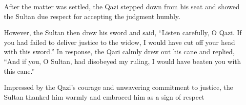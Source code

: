 \documentclass{article}
\begin{document}
After the matter was settled, the Qazi stepped down from his seat and showed the Sultan due respect for accepting the judgment humbly.

However, the Sultan then drew his sword and said, “Listen carefully, O Qazi. If you had failed to deliver justice to the widow, I would have cut off your head with this sword.” In response, the Qazi calmly drew out his cane and replied, “And if you, O Sultan, had disobeyed my ruling, I would have beaten you with this cane.”

Impressed by the Qazi’s courage and unwavering commitment to justice, the Sultan thanked him warmly and embraced him as a sign of respect
\end{document}
